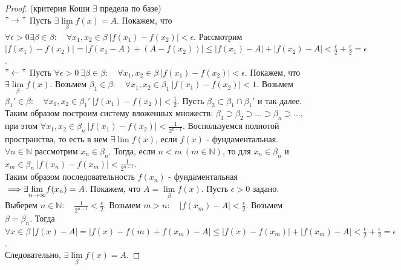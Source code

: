 \documentclass{report}
\theoremstyle{definition}
\begin{document}
\begin{proof}
  (критерия Коши $\exists$ предела по базе)\\

  $"\rightarrow"$ Пусть $\exists \underset{\beta}{\lim}f(x) = A$. Покажем, что $\forall \epsilon > 0 \exists \beta \in
    \beta: \quad \forall x_{1},x_{2} \in \beta \ |f(x_{1}) - f(x_{2})| < \epsilon$. Рассмотрим $| f(x_{1}) - f(x_{2}) |
    = | f(x_{1} - A) + (A - f(x_{2})) | \leqslant | f(x_{1}) - A | + | f(x_{2}) - A | < \frac{\epsilon}{2} +
    \frac{\epsilon}{2} = \epsilon$.\\

  $"\leftarrow"$ Пусть $\forall \epsilon > 0 \ \exists \beta\in\beta: \quad \forall x_{1},x_{2}\in\beta \ | f(x_{1}) -
    f(x_{2}) |<\epsilon$. Покажем, что $\exists \underset{\beta}{\lim}f(x)$. Возьмем $\beta_{1} \in \beta: \quad
    \forall x_{1},x_{2}\in\beta_{1} \ | f(x_{1}) - f(x_{2}) | < 1$. Возьмем $\beta_{1}'\in\beta: \quad \forall
    x_{1},x_{2}\in\beta_{1}' \ | f(x_{1}) - f(x_{2}) | < \frac{1}{2}$. Пусть $\beta_{2} \subset \beta_{1} \cap \beta_{1}'$
  и так далее.\\

  Таким образом построим систему вложенных множеств: $\beta_{1} \supset \beta_{2} \supset \ldots \supset \beta_{n}
    \supset \ldots$, при этом $\forall x_{1},x_{2} \in \beta_{n} \ | f(x_{1}) - f(x_{2}) | < \frac{1}{2^{n-1}}$.
  Воспользуемся полнотой пространства, то есть в нем $\exists \lim f(x)$, если $f(x)$ - фундаментальная.\\

  $\forall n \in \mathbb{N}$ рассмотрим $x_{n} \in \beta_{n}$. Тогда, если $n < m \ (m \in \mathbb{N})$, то
  для $x_{n} \in \beta_{n}$ и $x_{m} \in \beta_{n} \ | f(x_{n}) - f(x_{m}) | < \frac{1}{2^{n-1}}$.\\

  Таким образом последовательность ${f(x_{n})}$ - фундаментальная $\implies \\ \exists \underset{n\rightarrow\infty}{\lim}
    f(x_{n}) = A$. Покажем, что $A = \underset{\beta}{\lim}f(x)$. Пусть $\epsilon > 0$ задано. Выберем $n\in\mathbb{N}:\quad
    \frac{1}{2^{n-1}} < \frac{\epsilon}{2}$. Возьмем $m>n:\quad | f(x_{m}) - A | < \frac{\epsilon}{2}$. Возьмем $\beta =
    \beta_{n}$. Тогда $\forall x \in \beta \ | f(x) - A | = | f(x) - f(m) + f(x_{m}) - A | \leqslant | f(x) - f(x_{m}) | +
    | f(x_{m}) - A | < \frac{\epsilon}{2} + \frac{\epsilon}{2} = \epsilon$.\\

  Следовательно, $\exists\underset{\beta}{\lim}f(x) = A$.
\end{proof}
\end{document}
